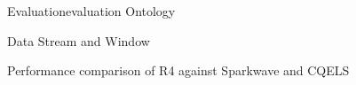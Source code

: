 \begin{nestedsection}{Evaluation}{evaluation}
	Ontology

	Data Stream and Window

	Performance comparison of R4 against Sparkwave and CQELS

\end{nestedsection}